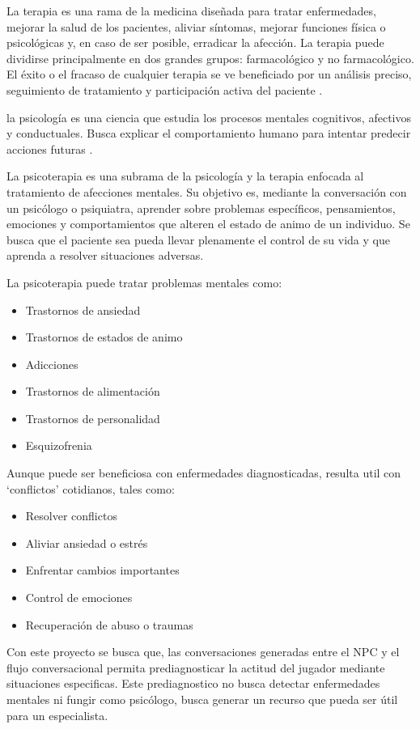 \documentclass[12pt,twoside]{article}
\begin{document}
	La terapia es una rama de la medicina diseñada para tratar enfermedades, mejorar la salud de los pacientes, aliviar síntomas, mejorar funciones física o psicológicas y, en caso de ser posible, erradicar la afección. La terapia puede dividirse principalmente en dos grandes grupos: farmacológico y no farmacológico. El éxito o el fracaso de cualquier terapia se ve beneficiado por un análisis preciso, seguimiento de tratamiento y participación activa del paciente \cite{info: terapia1}. 
	
	la psicología es una ciencia que estudia los procesos mentales cognitivos, afectivos y conductuales. Busca explicar el comportamiento humano para intentar predecir acciones futuras \cite{info: terapia2}.
	
	La psicoterapia es una subrama de la psicología y la terapia enfocada al tratamiento de afecciones mentales. Su objetivo es, mediante la conversación con un psicólogo o psiquiatra, aprender sobre problemas específicos, pensamientos, emociones y comportamientos que alteren el estado de animo de un individuo. Se busca que el paciente sea pueda llevar plenamente el control de su vida y que aprenda a resolver situaciones adversas.
	
	La psicoterapia puede tratar problemas mentales como:
	\begin{itemize}[noitemsep]
		\item Trastornos de ansiedad
		\item Trastornos de estados de animo
		\item Adicciones
		\item Trastornos de alimentación
		\item Trastornos de personalidad
		\item Esquizofrenia
	\end{itemize}
	
	Aunque puede ser beneficiosa con enfermedades diagnosticadas, resulta util con `conflictos' cotidianos, tales como:
	\begin{itemize}[noitemsep]
		\item Resolver conflictos
		\item Aliviar ansiedad o estrés
		\item Enfrentar cambios importantes
		\item Control de emociones
		\item Recuperación de abuso o traumas \cite{info: terapia3}
	\end{itemize}
	
	Con este proyecto se busca que, las conversaciones generadas entre el NPC y el flujo conversacional permita prediagnosticar la actitud del jugador mediante situaciones especificas. Este prediagnostico no busca detectar enfermedades mentales ni fungir como psicólogo, busca generar un recurso que pueda ser útil para un especialista.
	
\end{document}
